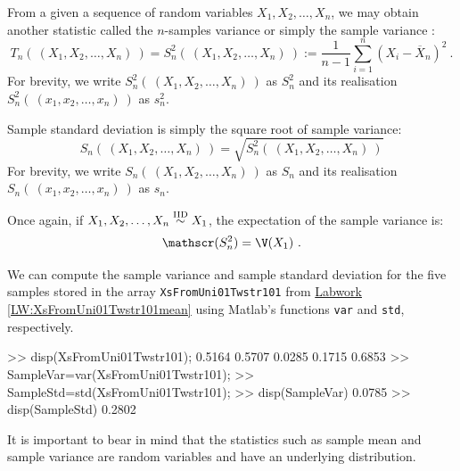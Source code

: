 \begin{definition}
From a given a sequence of random variables $X_1,X_2,\ldots,X_n$, we may obtain another statistic called the $n$-samples variance or simply the sample variance :
\begin{equation}\label{E:SampleVarianceRV}
T_n( \ (X_1,X_2,\ldots,X_n) \ ) = S^2_n( \ (X_1,X_2,\ldots,X_n) \ )  := \frac{1}{n-1} \sum_{i=1}^n {(X_i - \overline{X}_n)^2}  \ .
\end{equation}
For brevity, we write $S^2_n( \ (X_1,X_2,\ldots,X_n) \ )$ as $S^2_n$ and its  realisation $S^2_n( \ (x_1,x_2,\ldots,x_n) \ )$ as $s^2_n$.

Sample standard deviation is simply the square root of sample variance:
\begin{equation}\label{E:SampleStdDevRV}
S_n( \ (X_1,X_2,\ldots,X_n) \ ) = \sqrt{S^2_n( \ (X_1,X_2,\ldots,X_n) \ )}
\end{equation}
For brevity, we write $S_n( \ (X_1,X_2,\ldots,X_n) \ )$ as $S_n$ and its  realisation $S_n( \ (x_1,x_2,\ldots,x_n) \ )$ as $s_n$.
\end{definition}
Once again, if $X_1,X_2,\ldots,X_n \overset{{\rm IID}}{\sim} X_1$, the expectation of the sample variance is:
\[
\E(S^2_n) = \V(X_1) \ .
\]
\begin{labwork}\label{LW:XsFromUni01Twstr101varstd}
We can compute the sample variance and sample standard deviation for the five samples stored in the array {\tt XsFromUni01Twstr101} from \hyperref[LW:XsFromUni01Twstr101mean]{Labwork \ref*{LW:XsFromUni01Twstr101mean}} using {\sc Matlab}'s functions {\tt var} and {\tt std}, respectively.
\begin{VrbM}
>> disp(XsFromUni01Twstr101); %
    0.5164    0.5707    0.0285    0.1715    0.6853
>> SampleVar=var(XsFromUni01Twstr101);%
>> SampleStd=std(XsFromUni01Twstr101);%
>> disp(SampleVar) %
    0.0785
>> disp(SampleStd) %
    0.2802
\end{VrbM}
\end{labwork}
It is important to bear in mind that the statistics such as sample mean and sample variance are random variables and have an underlying distribution.

